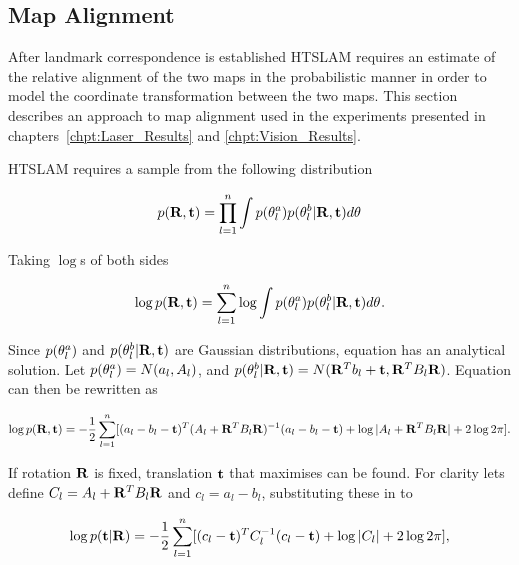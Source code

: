 \subsection{Map Alignment}
\label{sec:map_alignment}

After landmark correspondence is established HTSLAM requires an
estimate of the relative alignment of the two maps in the
probabilistic manner in order to model the coordinate transformation
between the two maps. This section describes an approach to map
alignment used in the experiments presented in
chapters~\ref{chpt:Laser_Results} and \ref{chpt:Vision_Results}.

HTSLAM requires a sample from the following distribution

\begin{equation}
p({\bf R},{\bf t}) = \prod_{l=1}^{n} \int
p(\mape{}{a}{l})p(\mape{}{b}{l}|{\bf R},{\bf t})d\mape{}{}{}
\label{eqn:align_w}
\end{equation}

Taking $\log$s of both sides

\begin{equation}
\log p({\bf R},{\bf t}) = \sum_{l=1}^{n} \log \int
p(\mape{}{a}{l})p(\mape{}{b}{l}|{\bf R},{\bf t})d\mape{}{}{}.
\label{eqn:align_log_w}
\end{equation}

Since $p(\mape{}{a}{l})$ and $p(\mape{}{b}{l}|{\bf R},{\bf t})$ are
Gaussian distributions, equation  has an
analytical solution. Let $p(\mape{}{a}{l}) = N(a_l,A_l)$, and
$p(\mape{}{b}{l}|{\bf R},{\bf t}) = N({\bf R}^Tb_l + {\bf t},{\bf R}^T
B_l {\bf R})$. Equation  can then be
rewritten as

\begin{equation}
\log p({\bf R},{\bf t}) = -\frac{1}{2}\sum_{l=1}^{n}[ (a_l-b_l-{\bf t})^T (A_l + {\bf R}^TB_l{\bf R})^{-1}
(a_l-b_l-{\bf t}) + \log |A_l + {\bf R}^TB_l{\bf R}| + 2\log 2\pi].
\label{eqn:align_log_w_matrix_form}
\end{equation}

If rotation ${\bf R}$ is fixed, translation ${\bf t}$ that maximises
 can be found. For clarity
lets define $C_l = A_l + {\bf R}^TB_l{\bf R}$ and $c_l = a_l - b_l$,
substituting these in to 

\begin{equation}
\log p({\bf t}|{\bf R}) = -\frac{1}{2}\sum_{l=1}^{n}[ (c_l-{\bf t})^T C_l^{-1}(c_l-{\bf t}) 
+ \log |C_l| + 2 \log 2\pi],
\label{eqn:align_log_w_matrix_form_t0}
\end{equation}

